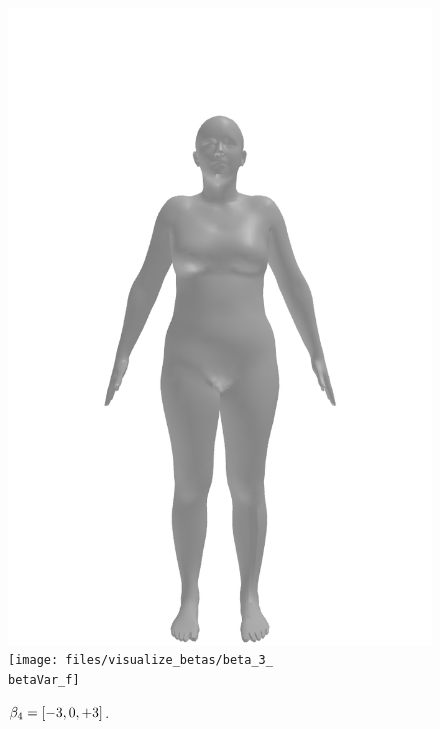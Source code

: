 \begin{figure}[ht!]
\begin{minipage}[b]{\textwidth}
        \includegraphics[width=\imgWidth]{files/visualize_betas/baseline_f}
        \texttt{[image: files/visualize\_betas/beta\_3\_\\betaVar\_f]}
        \caption[Effect of varying $\beta_4$ in SMPL.]{$\beta_4 = [-3, 0, +3]$.}
    \end{minipage}
\end{figure}

